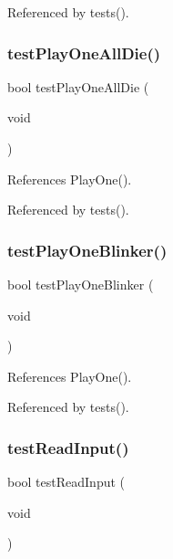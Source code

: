 Referenced by tests().

\mbox{\label{tests_8h_a6d4b00dae79274e5ba83ddbf0332dd95}} 
\subsubsection{test\+Play\+One\+All\+Die()}
{\footnotesize\ttfamily bool test\+Play\+One\+All\+Die (\begin{DoxyParamCaption}\item[{void}]{ }\end{DoxyParamCaption})}



References Play\+One().



Referenced by tests().

\mbox{\label{tests_8h_a8c76856f6c17c69dc291c9c921298b9e}} 
\subsubsection{test\+Play\+One\+Blinker()}
{\footnotesize\ttfamily bool test\+Play\+One\+Blinker (\begin{DoxyParamCaption}\item[{void}]{ }\end{DoxyParamCaption})}



References Play\+One().



Referenced by tests().

\mbox{\label{tests_8h_aa89f64db87aebe77bd891e2894595e4e}} 
\subsubsection{test\+Read\+Input()}
{\footnotesize\ttfamily bool test\+Read\+Input (\begin{DoxyParamCaption}\item[{void}]{ }\end{DoxyParamCaption})}



